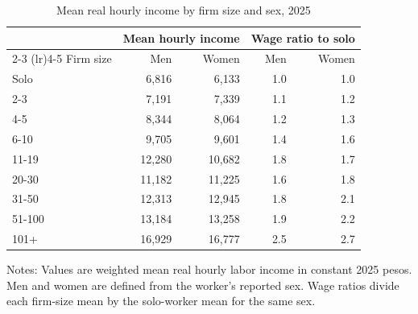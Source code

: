 \begin{table}[htbp]
  \centering
  \caption{Mean real hourly income by firm size and sex, 2025}
  \label{tab:descriptive-wage-sex-size-2025}
  \small
  \begin{tabular}{lrrrr}
    \toprule
    & \multicolumn{2}{c}{Mean hourly income} & \multicolumn{2}{c}{Wage ratio to solo} \\
    \cmidrule(lr){2-3} \cmidrule(lr){4-5}
    Firm size & Men & Women & Men & Women \\
    \midrule
    Solo & 6,816 & 6,133 & 1.0 & 1.0 \\
    2-3 & 7,191 & 7,339 & 1.1 & 1.2 \\
    4-5 & 8,344 & 8,064 & 1.2 & 1.3 \\
    6-10 & 9,705 & 9,601 & 1.4 & 1.6 \\
    11-19 & 12,280 & 10,682 & 1.8 & 1.7 \\
    20-30 & 11,182 & 11,225 & 1.6 & 1.8 \\
    31-50 & 12,313 & 12,945 & 1.8 & 2.1 \\
    51-100 & 13,184 & 13,258 & 1.9 & 2.2 \\
    101+ & 16,929 & 16,777 & 2.5 & 2.7 \\
    \bottomrule
  \end{tabular}
  \vspace{0.3em}
  \begin{minipage}{0.95\textwidth}
  \footnotesize
  Notes: Values are weighted mean real hourly labor income in constant 2025 pesos. Men and women are defined from the worker's reported sex. Wage ratios divide each firm-size mean by the solo-worker mean for the same sex.
  \end{minipage}
\end{table}
